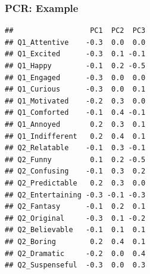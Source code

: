 \documentclass[
  shownotes,
  xcolor={svgnames},
  hyperref={colorlinks,citecolor=DarkBlue,linkcolor=DarkRed,urlcolor=DarkBlue}
  , aspectratio=169]{beamer}
\newenvironment{Shaded}{\begin{snugshade}}{\end{snugshade}}
\newcommand{\DecValTok}[1]{\textcolor[rgb]{0.00,0.00,0.81}{#1}}
\newcommand{\FunctionTok}[1]{\textcolor[rgb]{0.00,0.00,0.00}{#1}}
\newcommand{\NormalTok}[1]{#1}
\newcommand{\SpecialCharTok}[1]{\textcolor[rgb]{0.00,0.00,0.00}{#1}}
\begin{document}
\begin{frame}[fragile]
\frametitle{PCR: Example }

\begin{scriptsize}


\begin{Shaded}
\end{Shaded}
\end{scriptsize}
\begin{tiny}


\begin{verbatim}
##                  PC1  PC2  PC3
## Q1_Attentive    -0.3  0.0  0.0
## Q1_Excited      -0.3  0.1 -0.1
## Q1_Happy        -0.1  0.2 -0.5
## Q1_Engaged      -0.3  0.0  0.0
## Q1_Curious      -0.3  0.0  0.1
## Q1_Motivated    -0.2  0.3  0.0
## Q1_Comforted    -0.1  0.4 -0.1
## Q1_Annoyed       0.2  0.3  0.1
## Q1_Indifferent   0.2  0.4  0.1
## Q2_Relatable    -0.1  0.3 -0.1
## Q2_Funny         0.1  0.2 -0.5
## Q2_Confusing    -0.1  0.3  0.2
## Q2_Predictable   0.2  0.3  0.0
## Q2_Entertaining -0.3 -0.1 -0.3
## Q2_Fantasy      -0.1  0.2  0.1
## Q2_Original     -0.3  0.1 -0.2
## Q2_Believable   -0.1  0.1  0.1
## Q2_Boring        0.2  0.4  0.1
## Q2_Dramatic     -0.2  0.0  0.4
## Q2_Suspenseful  -0.3  0.0  0.3
\end{verbatim}
\end{tiny}
\end{frame}
\end{document}
